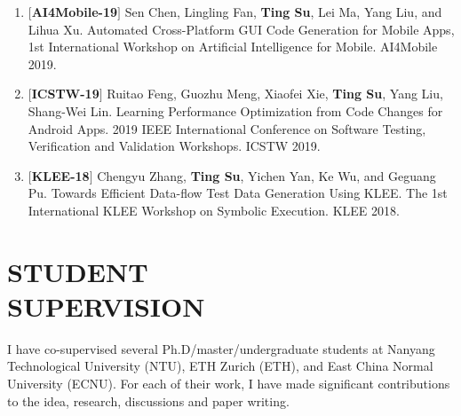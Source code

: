 \documentclass[margin]{res}
\begin{document}
\begin{resume}
\begin{enumerate}[leftmargin=*]
    \item $[$\textbf{AI4Mobile-19}$]$ Sen Chen, Lingling Fan, \textbf{Ting Su}, Lei Ma, Yang Liu, and Lihua Xu. Automated Cross-Platform GUI Code Generation for Mobile Apps, 1st International Workshop on Artificial Intelligence for Mobile. AI4Mobile 2019.
    \item $[$\textbf{ICSTW-19}$]$ Ruitao Feng, Guozhu Meng, Xiaofei Xie, \textbf{Ting Su}, Yang Liu, Shang-Wei Lin. Learning Performance Optimization from Code Changes for Android Apps. 2019 IEEE International Conference on Software Testing, Verification and Validation Workshops. ICSTW 2019.
    \item $[$\textbf{KLEE-18}$]$ Chengyu Zhang, \textbf{Ting Su}, Yichen Yan, Ke Wu, and Geguang Pu. Towards Efficient Data-flow Test Data Generation Using KLEE. The 1st International KLEE Workshop on Symbolic Execution. KLEE 2018.
\end{enumerate}

\section{STUDENT\\SUPERVISION}
I have co-supervised several Ph.D/master/undergraduate students at Nanyang Technological University (NTU), ETH Zurich (ETH), and East China Normal University (ECNU). For each of their work, I have made significant contributions to the idea, research, discussions and paper writing.


\end{resume}
\end{document}

